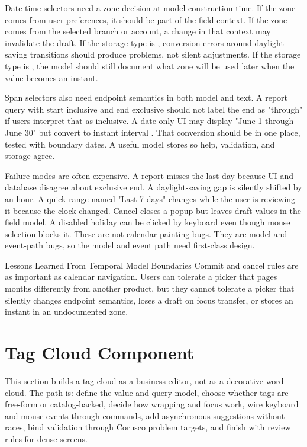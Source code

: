 Date-time selectors need a zone decision at model construction time. If the zone comes
from user preferences, it should be part of the field context. If the zone comes from
the selected branch or account, a change in that context may invalidate the draft. If
the storage type is , conversion errors around daylight-saving transitions
should produce problems, not silent adjustments. If the storage type is
, the model should
still document what zone will be used later when the value becomes an instant.

Span selectors also need endpoint semantics in both model and text. A report query with
start inclusive and end exclusive should not label the end as "through" if users
interpret that as inclusive. A date-only UI may display "June 1 through June 30" but
convert to instant interval
\api{[June 1 00:00, July 1 00:00)}. That conversion should be in one place,
tested with boundary dates. A useful model stores  so help,
validation, and storage agree.

Failure modes are often expensive. A report misses the last day because UI and database
disagree about exclusive end. A daylight-saving gap is silently shifted by an hour. A
quick range named "Last 7 days" changes while the user is reviewing it because the clock
changed. Cancel closes a popup but leaves draft values in the field model. A disabled
holiday can be clicked by keyboard even though mouse selection blocks it. These are not
calendar painting bugs. They are model and event-path bugs, so the model and event path
need first-class design.

\begin{principlebox}{Lessons Learned From Temporal Model Boundaries}
Commit and cancel rules are as important as calendar navigation. Users can
tolerate a picker that pages months differently from another product, but they
cannot tolerate a picker that silently changes endpoint semantics, loses a draft
on focus transfer, or stores an instant in an undocumented zone.
\end{principlebox}

\section{Tag Cloud Component}

\begin{roadmapbox}
This section builds a tag cloud as a business editor, not as a decorative word
cloud. The path is: define the value and query model, choose whether tags are
free-form or catalog-backed, decide how wrapping and focus work, wire keyboard
and mouse events through commands, add asynchronous suggestions without races,
bind validation through Corusco problem targets, and finish with review rules
for dense screens.
\end{roadmapbox}

